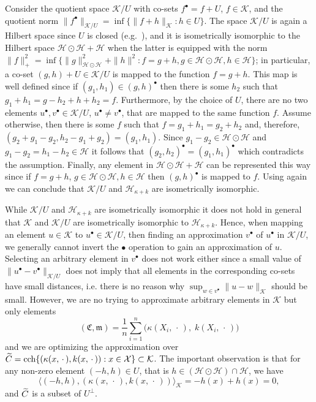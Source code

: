 \documentclass[AHL,Unicode,longabstracts,published]{cedram}
\theoremstyle{remark}
\DeclareMathOperator{\cch}{cch}
\newcommand{\X}{\mathcal{X}}
\newcommand{\cH}{\mathcal{H}}
\newcommand{\clK}{\mathcal{K}}
\newcommand{\fkC}{\mathfrak{C}}
\newcommand{\mean}{\mathfrak{m}}
\let\oldtilde\tilde
\renewcommand*{\tilde}[1]{\mathchoice{\widetilde{#1}}{\widetilde{#1}}{\oldtilde{#1}}{\oldtilde{#1}}}
\begin{document}
Consider the quotient space $\clK / U$ with co-sets $f^\bullet = f + U$, $f\in \clK$, and the quotient norm $\|f^\bullet \|_{\clK/U} = \inf\{\|f+h\|_\clK : h \in U \}$. The space $\clK/U$ is again a Hilbert space since $U$ is closed (e.g.~\cite[Section~III.4]{REED72}), and it is isometrically isomorphic to the Hilbert space $\cH \odot \cH + \cH$ when the latter is equipped with the norm $\|f\|_+^2 = \inf \{\|g\|^2_{\cH \odot \cH} + \|h\|^2 : f=g+h, g \in \cH \odot \cH, h \in \cH \} $; in particular, a co-set $(g,h) + U \in \clK/U$ is mapped to the function $f = g + h$. This map is well defined since if $(g_1,h_1) \in (g,h)^\bullet$ then there is some $h_2$ such that $g_1 + h_1 = g - h_2 + h + h_2 = f$. Furthermore, by the choice of $U$, there are no two elements $u^\bullet,v^\bullet \in \clK/U$, $u^\bullet \not= v^\bullet$, that are mapped to the same function $f$. Assume otherwise, then there is some $f$ such that $f = g_1 +h_1 = g_2 + h_2$ and, therefore, $(g_2 + g_1 - g_2, h_2 - g_1 + g_2) = (g_1, h_1)$. Since $g_1 - g_2 \in \cH \odot \cH$ and $g_1 - g_2 = h_1 - h_2 \in \cH$ it follows that $(g_2,h_2)^\bullet = (g_1, h_1)^\bullet$ which contradicts the assumption. Finally, any element in $\cH \odot \cH + \cH$ can be represented this way since if $f = g + h$, $g \in \cH \odot \cH, h \in \cH$ then $(g,h)^\bullet$ is mapped to $f$. Using again~\cite[Theorem p.~353]{ARON50} we can conclude that $\clK/U$ and $\cH_{\kappa + k}$ are isometrically isomorphic.

While $\clK/U$ and $\cH_{\kappa + k}$ are isometrically isomorphic it does not hold in general that $\clK$ and $\clK/U$ are isometrically isomorphic to $\cH_{\kappa + k}$. Hence, when mapping an element $u\in \clK$ to $u^\bullet \in \clK/U$, then finding an approximation $v^\bullet$ of $u^\bullet$ in $\clK/U$, we generally cannot invert the $\bullet$ operation to gain an approximation of $u$. Selecting an arbitrary element in $v^\bullet$ does not work either since a small value of $\|u^\bullet - v^\bullet\|_{\clK/U}$ does not imply that all elements in the corresponding co-sets have small distances, i.e. there is no reason why $\sup_{w\in v^\bullet} \|u - w\|_\clK$ should be small. However, we are no trying to approximate arbitrary elements in $\clK$ but only elements
\[
(\fkC,\mean) = \frac{1}{n} \sum_{i=1}^n \bigl(\kappa(X_i,\,\cdot\,),\;k(X_i,\,\cdot\,)\bigr)
\]
and we are optimizing the approximation over $\tilde C = \cch \{(\kappa(x,\,\cdot\,), k(x,\,\cdot\,)) : x\in\linebreak \X \} \subset \clK$. The important observation is that for any non-zero element $(-h,h) \in U$, that is $h\in (\cH \odot \cH) \cap \cH$, we have
\[
\bigl\langle (-h,h), (\kappa(x,\,\cdot\,), k(x,\,\cdot\,)) \bigr\rangle_\clK = -h(x) + h(x) = 0,
\]
and $\tilde C$ is a subset of $U^\perp$.
\end{document}
